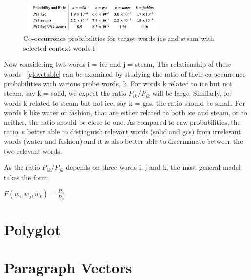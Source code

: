 \begin{figure}[ht!]
	\centering
		\includegraphics[height=15mm,  width=75mm]{figures/4_glovetable.png}
		\caption[Co-occurrence probabilities for target words]{Co-occurrence probabilities for target words ice and steam with selected context words f}
			\label{glovetable}
\end{figure}

Now considering two words i = ice and j = steam, The relationship of these words ~\autoref{glovetable} can be examined by studying the ratio of their co-occurrence probabilities with various probe words, k. For words k related to ice but not steam, say k = solid, we expect the ratio ${P}_{ik} /{P}_{jk}$ will be large. Similarly, for words k related to steam but not ice, say k = gas, the ratio should be small. For words k like water or fashion, that are either related to both ice and steam, or to neither, the ratio should be close to one. As compared to raw probabilities, the ratio is better able to distinguish relevant words (solid and gas) from irrelevant words (water and fashion) and it is also better able to discriminate between the two relevant words.

As the ratio ${P}_{ik} /{P}_{jk}$ depends on three words i, j and k, the most general model takes the form:
\begin{center}
$F({w}_{i},{w}_{j},{\tilde{w}}_{k}) = \frac{{P}_{ik}}{{P}_{jk}}$
\end{center}

\section{Polyglot}
\section{Paragraph Vectors}